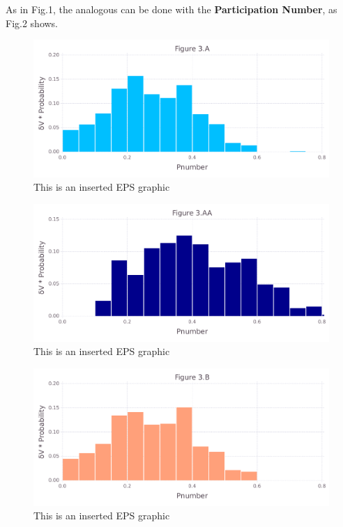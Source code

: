 \documentclass[10pt,letterpaper]{article}
\begin{document}
\clearpage
As in Fig.1, the analogous can be done with the \textbf{Participation Number}, as Fig.2 shows.

\begin{figure}[ht]
\begin{center}
\includegraphics[scale=0.5]{256l/3afigure_hi-precision.pdf}
\caption{This is an inserted EPS graphic}
\label{fig7}
\end{center}
\end{figure}

\begin{figure}[ht]
\begin{center}
\includegraphics[scale=0.5]{256l/3aafigure_hi-precision.pdf}
\caption{This is an inserted EPS graphic}
\label{fig8}
\end{center}
\end{figure}

\begin{figure}[ht]
\begin{center}
\includegraphics[scale=0.5]{256l/3bfigure_hi-precision.pdf}
\caption{This is an inserted EPS graphic}
\label{fig10}
\end{center}
\end{figure}
\end{document}
